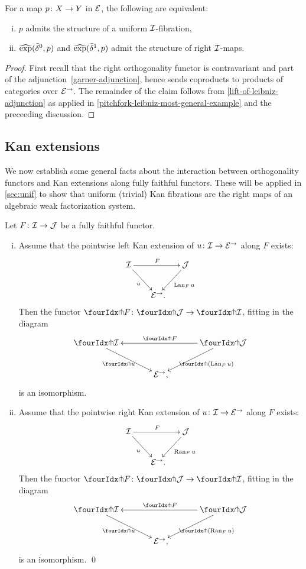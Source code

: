 \documentclass[reqno,10pt,a4paper,oneside,draft]{amsart}
\begin{document}
\begin{proposition} \label{prod-exp-general}
For a map $p \co X \to Y$ in $\catE$, the following are equivalent:
\begin{enumerate}[(i)]
\item $p$ admits the structure of a uniform $\cal{I}$-fibration,
\item $\hatexp(\bar{\delta}^0, p)$ and $\hatexp(\bar{\delta}^1, p)$ admit the structure of right $\cal{I}$-maps.
\end{enumerate}
\end{proposition}

\begin{proof}
First recall that the right orthogonality functor is contravariant and part of the adjunction~\eqref{garner-adjunction}, hence sends coproducts to products of categories over $\catE^\to$.
The remainder of the claim follows from \cref{lift-of-leibniz-adjunction} as applied in \cref{pitchfork-leibniz-most-general-example} and the preceeding discussion.
\end{proof}

\subsection*{Kan extensions}

We now establish some general facts about the interaction between orthogonality functors and Kan extensions along fully faithful functors. These will be applied in \cref{sec:unif} to show that uniform (trivial) Kan fibrations are the right maps of an algebraic weak factorization system.

\begin{proposition} \label{kan-extension-closure}
Let $F \co \cal{I} \to \cal{J}$ be a fully faithful functor.
\begin{enumerate}[(i)]
\item Assume that the pointwise left Kan extension of $u \co \cal{I} \to \catE^\to$ along $F$ exists:
\[
\xymatrix@!C@C-1em{
  \cal{I}
  \ar[dr]_{u}
  \ar[rr]^{F}
&&
  \cal{J}
  \ar[dl]^{\Lan_F u}
\\&
  \catE^\to
\rlap{.}}
\]
Then the functor $\liftr{F} \co \liftr{\cal{J}} \to \liftr{\cal{I}}$, fitting in the diagram
\[
\xymatrix@!C@C-1em{
  \liftr{\cal{I}}
  \ar[dr]_{\liftr{u}}
&&
  \liftr{\cal{J}}
  \ar[ll]_{\liftr{F}}
  \ar[dl]^{\liftr{(\Lan_F u)}}
\\&
  \catE^\to
\rlap{,}}
\]
is an isomorphism.
\item Assume that the pointwise right Kan extension of $u \co \cal{I} \to \catE^\to$ along $F$ exists:
\[
\xymatrix@!C@C-1em{
  \cal{I}
  \ar[dr]_{u}
  \ar[rr]^{F}
&&
  \cal{J}
  \ar[dl]^{\Ran_F u}
\\&
  \catE^\to
\rlap{.}}
\]
Then the functor $\liftl{F} \co \liftl{\cal{J}} \to \liftl{\cal{I}}$, fitting in the diagram
\[
\xymatrix@!C@C-1em{
  \liftl{\cal{I}}
  \ar[dr]_{\liftl{u}}
&&
  \liftl{\cal{J}}
  \ar[ll]_{\liftl{F}}
  \ar[dl]^{\liftl{(\Ran_F u)}}
\\&
  \catE^\to
\rlap{,}}
\]
is an isomorphism.
\qed
\end{enumerate}
\end{proposition}
\end{document}
